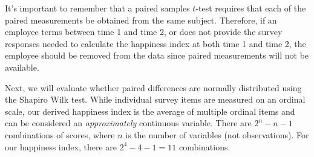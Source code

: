\documentclass[]{book}
\begin{document}
It's important to remember that a paired samples \(t\)-test requires that each of the paired measurements be obtained from the same subject. Therefore, if an employee terms between time 1 and time 2, or does not provide the survey responses needed to calculate the happiness index at both time 1 and time 2, the employee should be removed from the data since paired measurements will not be available.

Next, we will evaluate whether paired differences are normally distributed using the Shapiro Wilk test. While individual survey items are measured on an ordinal scale, our derived happiness index is the average of multiple ordinal items and can be considered an \emph{approximately} continuous variable. There are \(2^n - n - 1\) combinations of scores, where \(n\) is the number of variables (not observations). For our happiness index, there are \(2^4 - 4 - 1 = 11\) combinations.
\end{document}
